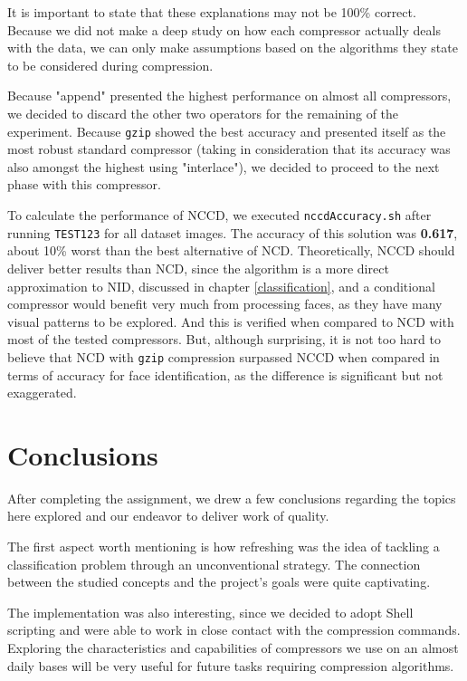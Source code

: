 \documentclass[12pt]{article}
\begin{document}
It is important to state that these explanations may not be 100\% correct.
Because we did not make a deep study on how each compressor actually deals with the data, we can only make assumptions based on the algorithms they state to 
be considered during compression.

\newpage
Because "append" presented the highest performance on almost all compressors, we decided to discard the other two operators for the remaining of the experiment.
Because \texttt{gzip} showed the best accuracy and presented itself as the most robust standard compressor (taking in consideration that its accuracy was also
amongst the highest using "interlace"), we decided to proceed to the next phase with this compressor.
\newline 

To calculate the performance of NCCD, we executed \texttt{nccdAccuracy.sh} after running \texttt{TEST123} for all dataset images.
The accuracy of this solution was \textbf{0.617}, about 10\% worst than the best alternative of NCD.
Theoretically, NCCD should deliver better results than NCD, since the algorithm is a more direct approximation to NID, discussed in chapter \ref{classification},
and a conditional compressor would benefit very much from processing faces, as they have many visual patterns to be explored.
And this is verified when compared to NCD with most of the tested compressors.
But, although surprising, it is not too hard to believe that NCD with \texttt{gzip} compression surpassed NCCD when compared in terms of accuracy for face 
identification, as the difference is significant but not exaggerated.

\newpage
\section{Conclusions} %

After completing the assignment, we drew a few conclusions regarding the topics here explored and our endeavor to deliver work of quality.

The first aspect worth mentioning is how refreshing was the idea of tackling a classification problem through an unconventional strategy.
The connection between the studied concepts and the project's goals were quite captivating.

The implementation was also interesting, since we decided to adopt Shell scripting and were able to work in close contact with the compression commands.
Exploring the characteristics and capabilities of compressors we use on an almost daily bases will be very useful for future tasks requiring compression algorithms.
\end{document}
